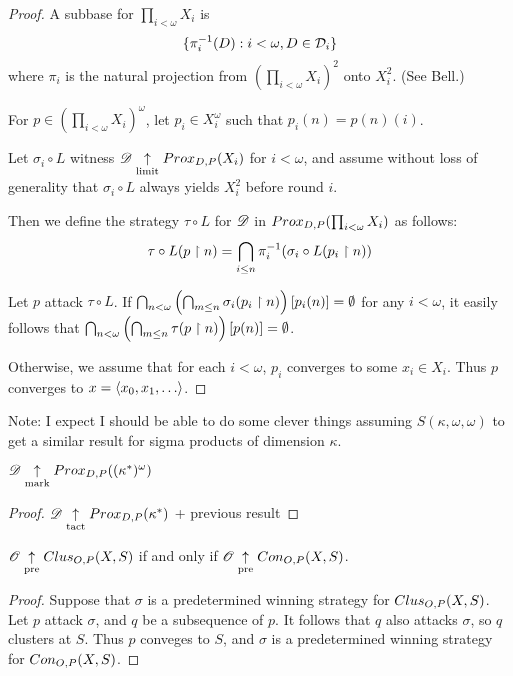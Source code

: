 \begin{proof}
  A subbase for $\prod_{i<\omega}X_i$ is
    \[
      \{\pi_i^{-1}(D):i<\omega, D\in\mathcal{D}_i\}
    \]
  where $\pi_i$ is the natural projection from 
  $\left(\prod_{i<\omega}X_i\right)^2$ onto $X_i^2$. (See Bell.)

  For $p\in \left(\prod_{i<\omega}X_i\right)^\omega$, let $p_i\in X_i^\omega$
  such that $p_i(n)=p(n)(i)$.

  Let $\sigma_i\circ L$ witness $\mathscr{D}\underset{\text{limit}}{\uparrow} Prox_{D,P}(X_i)$ for
  $i<\omega$, and assume without loss of generality that 
  $\sigma_i\circ L$ always yields $X_i^2$ before round $i$.

  Then we define the strategy $\tau\circ L$ for $\mathscr{D}$ in
  $Prox_{D,P}(\prod_{i<\omega}X_i)$ as follows:
    \[
      \tau\circ L(p\restriction n)
        =
      \bigcap_{i\leq n} \pi_i^{-1}(\sigma_i\circ L(p_i\restriction n))
    \]

  Let $p$ attack $\tau\circ L$. If
    $
      \bigcap_{n<\omega}
      \left(\bigcap_{m\leq n}\sigma_i(p_i\restriction n)\right)[p_i(n)]
      = \emptyset
    $
  for any $i<\omega$, it easily follows that 
    $
      \bigcap_{n<\omega}
      \left(\bigcap_{m\leq n}\tau(p\restriction n)\right)[p(n)]
      = \emptyset
    $.

  Otherwise, we assume that for each $i<\omega$, $p_i$ converges to some
  $x_i\in X_i$. Thus $p$ converges to $x=\<x_0,x_1,\dots\>$.
\end{proof}

Note: I expect I should be able to do some clever things 
assuming $S(\kappa,\omega,\omega)$ to get a similar result for sigma
products of dimension $\kappa$.

\begin{example}
  $\mathscr{D} \underset{\text{mark}}{\uparrow} Prox_{D,P}((\kappa^*)^\omega)$
\end{example}

\begin{proof}
  $\mathscr{D} \underset{\text{tact}}{\uparrow} Prox_{D,P}(\kappa^*)$ + previous result
\end{proof}




\newpage

\begin{lemma}
  $\mathscr{O}\underset{\text{pre}}{\uparrow}Clus_{O,P}(X,S)$ if and only if $\mathscr{O}\underset{\text{pre}}{\uparrow}Con_{O,P}(X,S)$.
\end{lemma}

\begin{proof}
  Suppose that $\sigma$ is a predetermined winning strategy for 
  $Clus_{O,P}(X,S)$. Let $p$ attack $\sigma$, and $q$ be a subsequence of $p$.
  It follows that $q$ also attacks $\sigma$, so $q$ clusters at $S$. Thus $p$
  conveges to $S$, and $\sigma$ is a predetermined winning strategy for 
  $Con_{O,P}(X,S)$.
\end{proof}


